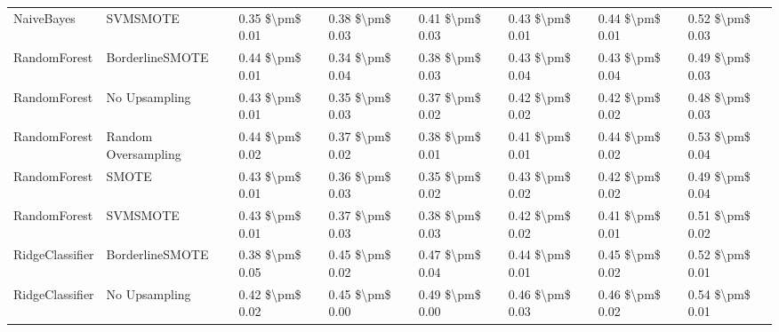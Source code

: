 \begin{tabular}{llllllll}
                     NaiveBayes &                      SVMSMOTE & 0.35 \$\textbackslash pm\$ 0.01 &           0.38 \$\textbackslash pm\$ 0.03 &       0.41 \$\textbackslash pm\$ 0.03 &        0.43 \$\textbackslash pm\$ 0.01 &                         0.44 \$\textbackslash pm\$ 0.01 &     0.52 \$\textbackslash pm\$ 0.03 \\
                   RandomForest &               BorderlineSMOTE & 0.44 \$\textbackslash pm\$ 0.01 &           0.34 \$\textbackslash pm\$ 0.04 &       0.38 \$\textbackslash pm\$ 0.03 &        0.43 \$\textbackslash pm\$ 0.04 &                         0.43 \$\textbackslash pm\$ 0.04 &     0.49 \$\textbackslash pm\$ 0.03 \\
                   RandomForest &                 No Upsampling & 0.43 \$\textbackslash pm\$ 0.01 &           0.35 \$\textbackslash pm\$ 0.03 &       0.37 \$\textbackslash pm\$ 0.02 &        0.42 \$\textbackslash pm\$ 0.02 &                         0.42 \$\textbackslash pm\$ 0.02 &     0.48 \$\textbackslash pm\$ 0.03 \\
                   RandomForest &           Random Oversampling & 0.44 \$\textbackslash pm\$ 0.02 &           0.37 \$\textbackslash pm\$ 0.02 &       0.38 \$\textbackslash pm\$ 0.01 &        0.41 \$\textbackslash pm\$ 0.01 &                         0.44 \$\textbackslash pm\$ 0.02 &     0.53 \$\textbackslash pm\$ 0.04 \\
                   RandomForest &                         SMOTE & 0.43 \$\textbackslash pm\$ 0.01 &           0.36 \$\textbackslash pm\$ 0.03 &       0.35 \$\textbackslash pm\$ 0.02 &        0.43 \$\textbackslash pm\$ 0.02 &                         0.42 \$\textbackslash pm\$ 0.02 &     0.49 \$\textbackslash pm\$ 0.04 \\
                   RandomForest &                      SVMSMOTE & 0.43 \$\textbackslash pm\$ 0.01 &           0.37 \$\textbackslash pm\$ 0.03 &       0.38 \$\textbackslash pm\$ 0.03 &        0.42 \$\textbackslash pm\$ 0.02 &                         0.41 \$\textbackslash pm\$ 0.01 &     0.51 \$\textbackslash pm\$ 0.02 \\
                RidgeClassifier &               BorderlineSMOTE & 0.38 \$\textbackslash pm\$ 0.05 &           0.45 \$\textbackslash pm\$ 0.02 &       0.47 \$\textbackslash pm\$ 0.04 &        0.44 \$\textbackslash pm\$ 0.01 &                         0.45 \$\textbackslash pm\$ 0.02 &     0.52 \$\textbackslash pm\$ 0.01 \\
                RidgeClassifier &                 No Upsampling & 0.42 \$\textbackslash pm\$ 0.02 &           0.45 \$\textbackslash pm\$ 0.00 &       0.49 \$\textbackslash pm\$ 0.00 &        0.46 \$\textbackslash pm\$ 0.03 &                         0.46 \$\textbackslash pm\$ 0.02 &     0.54 \$\textbackslash pm\$ 0.01 \\

\end{tabular}
